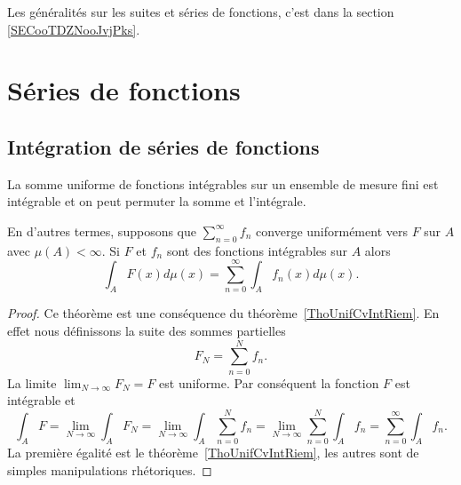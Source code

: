 
Les généralités sur les suites et séries de fonctions, c'est dans la section \ref{SECooTDZNooJvjPks}.

\section{Séries de fonctions}

\subsection{Intégration de séries de fonctions}

\begin{theorem}      \label{ThoCciOlZ}
    La somme uniforme de fonctions intégrables sur un ensemble de mesure fini est intégrable et on peut permuter la somme et l'intégrale.

    En d'autres termes, supposons que \( \sum_{n=0}^{\infty}f_n\) converge uniformément vers \( F\) sur \( A\) avec \( \mu(A)<\infty\). Si \( F\) et \( f_n\) sont des fonctions intégrables sur \( A\) alors
    \begin{equation}
        \int_AF(x)d\mu(x)=\sum_{n=0}^{\infty}\int_Af_n(x)d\mu(x).
    \end{equation}
\end{theorem}

\begin{proof}
    Ce théorème est une conséquence du théorème~\ref{ThoUnifCvIntRiem}. En effet nous définissons la suite des sommes partielles
    \begin{equation}
        F_N=\sum_{n=0}^Nf_n.
    \end{equation}
    La limite \( \lim_{N\to \infty} F_N=F\) est uniforme. Par conséquent la fonction \( F\) est intégrable et
    \begin{equation}
        \int_A F=\lim_{N\to \infty} \int_AF_N=\lim_{N\to \infty} \int_A\sum_{n=0}^Nf_n=\lim_{N\to \infty} \sum_{n=0}^N\int_Af_n=\sum_{n=0}^{\infty}\int_Af_n.
    \end{equation}
    La première égalité est le théorème~\ref{ThoUnifCvIntRiem}, les autres sont de simples manipulations rhétoriques.
\end{proof}

